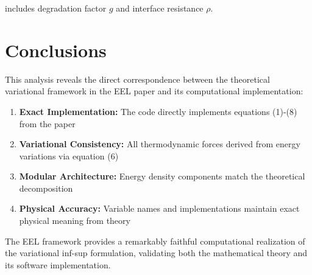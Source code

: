 \documentclass[11pt,a4paper]{article}
\begin{document}
includes degradation factor $g$ and interface resistance $\rho$.

\section{Conclusions}

This analysis reveals the direct correspondence between the theoretical variational framework in the EEL paper and its computational implementation:

\begin{enumerate}
\item \textbf{Exact Implementation:} The code directly implements equations (1)-(8) from the paper
\item \textbf{Variational Consistency:} All thermodynamic forces derived from energy variations via equation (6)
\item \textbf{Modular Architecture:} Energy density components match the theoretical decomposition
\item \textbf{Physical Accuracy:} Variable names and implementations maintain exact physical meaning from theory
\end{enumerate}

The EEL framework provides a remarkably faithful computational realization of the variational inf-sup formulation, validating both the mathematical theory and its software implementation.
\end{document}
